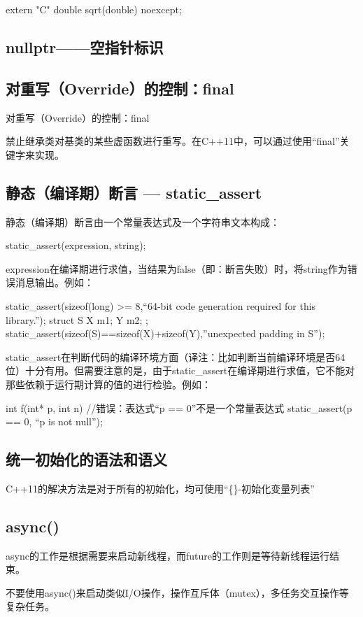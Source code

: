 extern "C" double sqrt(double) noexcept;

\subsection{nullptr——空指针标识}

\subsection{对重写（Override）的控制：final}
对重写（Override）的控制：final

禁止继承类对基类的某些虚函数进行重写。在C++11中，可以通过使用“final”关键字来实现。

\subsection{静态（编译期）断言 — static_assert}
静态（编译期）断言由一个常量表达式及一个字符串文本构成：
\begin{Code}
	static_assert(expression, string);
\end{Code}
expression在编译期进行求值，当结果为false（即：断言失败）时，将string作为错误消息输出。例如：

\begin{Code}
	static_assert(sizeof(long) >= 8,“64-bit code generation required for this library.”);
	struct S { X m1; Y m2; };
	static_assert(sizeof(S)==sizeof(X)+sizeof(Y),”unexpected padding in S”);
\end{Code}
static_assert在判断代码的编译环境方面（译注：比如判断当前编译环境是否64位）十分有用。但需要注意的是，由于static_assert在编译期进行求值，它不能对那些依赖于运行期计算的值的进行检验。例如：

\begin{Code}
	int f(int* p, int n){
		//错误：表达式“p == 0”不是一个常量表达式
		static_assert(p == 0, “p is not null”);
	}
\end{Code}
\subsection{统一初始化的语法和语义}
C++11的解决方法是对于所有的初始化，均可使用“\{\}-初始化变量列表”
\subsection{async()}
async的工作是根据需要来启动新线程，而future的工作则是等待新线程运行结束。

不要使用async()来启动类似I/O操作，操作互斥体（mutex），多任务交互操作等复杂任务。


